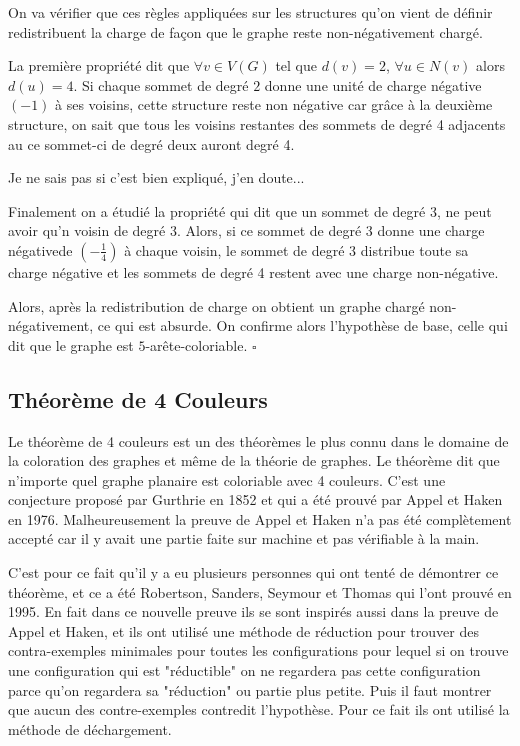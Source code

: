 \documentclass[10pt,a4paper]{article}
\newcommand{\ep}{{\hfill $\square$}}
\begin{document}
On va vérifier que ces règles appliquées sur les structures qu'on vient de définir redistribuent la charge de façon que le graphe reste non-négativement chargé.

La première propriété dit que $\forall v\in V(G)$ tel que $d(v) =2$, $\forall u \in N(v)$ alors $d(u) =4$. Si chaque sommet de degré $2$ donne une unité de charge négative $(-1)$ à ses voisins, cette structure reste non négative car grâce à la deuxième structure, on sait que tous les voisins restantes des sommets de degré 4 adjacents au ce sommet-ci de degré deux auront degré 4. 

{\color{red} Je ne sais pas si c'est bien expliqué, j'en doute...}

Finalement on a étudié la propriété qui dit que un sommet de degré 3, ne peut avoir qu'n voisin de degré 3. Alors, si ce sommet de degré 3 donne une charge négativede $(-\frac{1}{4})$ à chaque voisin, le sommet de degré 3 distribue toute sa charge négative et les sommets de degré 4 restent avec une charge non-négative.

Alors, après la redistribution de charge on obtient un graphe chargé non-négativement, ce qui est absurde. On confirme alors l'hypothèse de base, celle qui dit que le graphe est $5$-arête-coloriable.
\ep 


\subsection{Théorème de 4 Couleurs}







Le théorème de 4 couleurs est un des théorèmes le plus connu dans le domaine de la coloration des graphes et même de la théorie de graphes. Le théorème dit que n'importe quel graphe planaire est coloriable avec 4 couleurs. C'est une conjecture proposé par Gurthrie en 1852 et qui a été prouvé par Appel et Haken en 1976. Malheureusement la preuve de Appel et Haken n'a pas été complètement accepté car il y avait une partie faite sur machine et pas vérifiable à la main.

C'est pour ce fait qu'il y a eu plusieurs personnes qui ont tenté de démontrer ce théorème, et ce a été Robertson, Sanders, Seymour et Thomas qui l'ont prouvé en 1995. En fait dans ce nouvelle preuve ils se sont inspirés aussi dans la preuve de Appel et Haken, et ils ont utilisé une méthode de réduction pour trouver des contra-exemples minimales pour toutes les configurations pour lequel si on trouve une configuration qui est "réductible" on ne regardera pas cette configuration parce qu'on regardera sa "réduction" ou partie plus petite. Puis il faut montrer que aucun des contre-exemples contredit l'hypothèse. Pour ce fait ils ont utilisé la méthode de déchargement.
\end{document}
